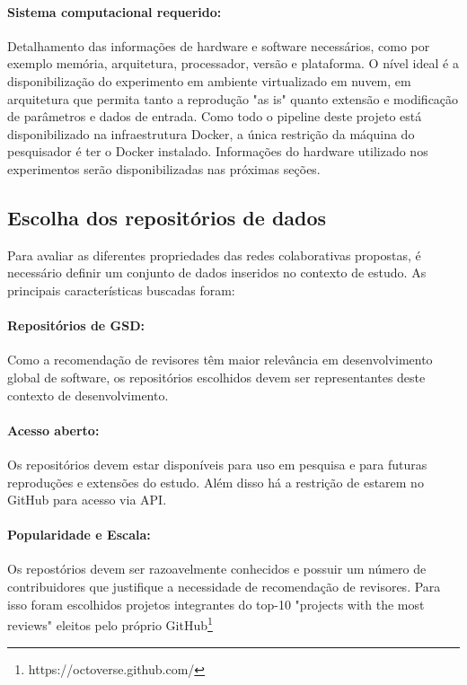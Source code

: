 \documentclass[sigconf]{acmart}
\begin{document}
\paragraph{Sistema computacional requerido:} Detalhamento das informações de hardware e software necessários, como por exemplo memória, arquitetura, processador, versão e plataforma. O nível ideal é a disponibilização do experimento em ambiente virtualizado em nuvem, em arquitetura que permita tanto a reprodução "as is" quanto extensão e modificação de parâmetros e dados de entrada. Como todo o pipeline deste projeto está disponibilizado na infraestrutura Docker, a única restrição da máquina do pesquisador é ter o Docker instalado. Informações do hardware utilizado nos experimentos serão disponibilizadas nas próximas seções.


\subsection{Escolha dos repositórios de dados}

Para avaliar as diferentes propriedades das redes colaborativas propostas, é necessário definir um conjunto de dados inseridos no contexto de estudo. As principais características buscadas foram:

\paragraph{Repositórios de GSD:} Como a recomendação de revisores têm maior relevância em desenvolvimento global de software, os repositórios escolhidos devem ser representantes deste contexto de desenvolvimento.

\paragraph{Acesso aberto: } Os repositórios devem estar disponíveis para uso em pesquisa e para futuras reproduções e extensões do estudo. Além disso há a restrição de estarem no GitHub para acesso via API.

\paragraph{Popularidade e Escala:} Os repostórios devem ser razoavelmente conhecidos e possuir um número de contribuidores que justifique a necessidade de recomendação de revisores. Para isso foram escolhidos projetos integrantes do top-10 "projects with the most reviews" eleitos pelo próprio GitHub\footnote{https://octoverse.github.com/}
\end{document}
